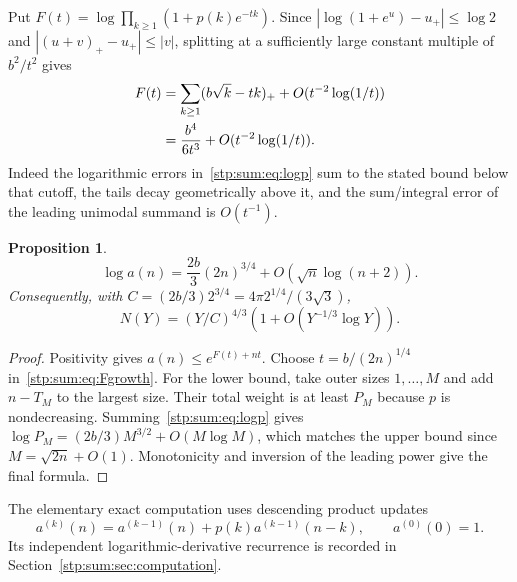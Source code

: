 \documentclass[11pt]{article}
\newtheorem{proposition}[theorem]{Proposition}
\theoremstyle{remark}\newtheorem{remark}[theorem]{Remark}
\begin{document}
Put $F(t)=\log\prod_{k\ge1}(1+p(k)e^{-tk})$. Since $|\log(1+e^u)-u_+|\le\log2$ and $|(u+v)_+-u_+|\le|v|$, splitting at a sufficiently large constant multiple of $b^2/t^2$ gives
\begin{align}
 F(t)&=\sum_{k\ge1}(b\sqrt k-tk)_++O(t^{-2}\log(1/t))\notag\\
 &=\frac{b^4}{6t^3}+O(t^{-2}\log(1/t)).\label{stp:sum:eq:Fgrowth}
\end{align}
Indeed the logarithmic errors in~\eqref{stp:sum:eq:logp} sum to the stated bound below that cutoff, the tails decay geometrically above it, and the sum/integral error of the leading unimodal summand is $O(t^{-1})$.

\begin{proposition}\label{stp:sum:prop:growth}
\begin{equation}\label{stp:sum:eq:growth}
 \log a(n)=\frac{2b}{3}(2n)^{3/4}+O(\sqrt n\log(n+2)).
\end{equation}
Consequently, with $C=(2b/3)2^{3/4}=4\pi2^{1/4}/(3\sqrt3)$,
\[
 N(Y)=(Y/C)^{4/3}\left(1+O(Y^{-1/3}\log Y)\right).
\]
\end{proposition}
\begin{proof}
Positivity gives $a(n)\le e^{F(t)+nt}$. Choose $t=b/(2n)^{1/4}$ in~\eqref{stp:sum:eq:Fgrowth}. For the lower bound, take outer sizes $1,\ldots,M$ and add $n-T_M$ to the largest size. Their total weight is at least $P_M$ because $p$ is nondecreasing. Summing~\eqref{stp:sum:eq:logp} gives $\log P_M=(2b/3)M^{3/2}+O(M\log M)$, which matches the upper bound since $M=\sqrt{2n}+O(1)$. Monotonicity and inversion of the leading power give the final formula.
\end{proof}
The elementary exact computation uses descending product updates
\[
 a^{(k)}(n)=a^{(k-1)}(n)+p(k)a^{(k-1)}(n-k),\qquad a^{(0)}(0)=1.
\]
Its independent logarithmic-derivative recurrence is recorded in Section~\ref{stp:sum:sec:computation}.
\end{document}
